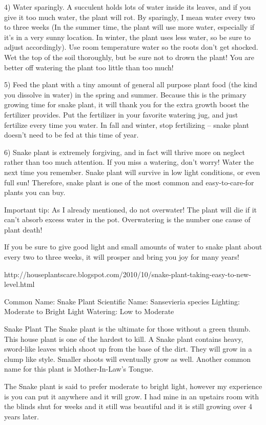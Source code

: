 \documentclass{book}
\begin{document}
4) Water sparingly. A succulent holds lots of water inside its leaves, and if you give it too much water, the plant will rot. By sparingly, I mean water every two to three weeks (In the summer time, the plant will use more water, especially if it's in a very sunny location. In winter, the plant uses less water, so be sure to adjust accordingly). Use room temperature water so the roots don’t get shocked. Wet the top of the soil thoroughly, but be sure not to drown the plant! You are better off watering the plant too little than too much!


5) Feed the plant with a tiny amount of general all purpose plant food (the kind you dissolve in water) in the spring and summer. Because this is the primary growing time for snake plant, it will thank you for the extra growth boost the fertilizer provides. Put the fertilizer in your favorite watering jug, and just fertilize every time you water. In fall and winter, stop fertilizing – snake plant doesn’t need to be fed at this time of year.

6) Snake plant is extremely forgiving, and in fact will thrive more on neglect rather than too much attention. If you miss a watering, don’t worry! Water the next time you remember. Snake plant will survive in low light conditions, or even full sun! Therefore, snake plant is one of the most common and easy-to-care-for plants you can buy.

Important tip: As I already mentioned, do not overwater! The plant will die if it can’t absorb excess water in the pot. Overwatering is the number one cause of plant death!

If you be sure to give good light and small amounts of water to snake plant about every two to three weeks, it will prosper and bring you joy for many years!

http://houseplantscare.blogspot.com/2010/10/snake-plant-taking-easy-to-new-level.html

Common Name: Snake Plant
Scientific Name: Sansevieria species
Lighting: Moderate to Bright Light
Watering: Low to Moderate


Snake Plant
The Snake plant is the ultimate for those without a green thumb. This house plant is one of the hardest to kill. A Snake plant contains heavy, sword-like leaves which shoot up from the base of the dirt. They will grow in a clump like style. Smaller shoots will eventually grow as well. Another common name for this plant is Mother-In-Law's Tongue.


The Snake plant is said to prefer moderate to bright light, however my experience is you can put it anywhere and it will grow. I had mine in an upstairs room with the blinds shut for weeks and it still was beautiful and it is still growing over 4 years later.
\end{document}
